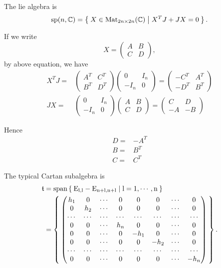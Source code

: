 \documentclass[12pt]{amsart}
\def\Mat{\rm{Mat}}
\def\bC{{\mathbb{C}}}
\def\sspan{\rm{span}}
\def\asp{\mathrm{sp}}
\def\ft{\mathfrak{t}}
\def\Mat{\mathrm{Mat}}
\begin{document}
The lie algebra is 
\[
\asp(n,\bC) = \Set{X\in \Mat_{2n\times 2n}(\bC)| X^TJ + JX = 0}.
\]

If we write 
\[
X = \begin{pmatrix}
  A & B \\
  C & D 
\end{pmatrix},
\]
by above equation, we have
\begin{align*}
X^TJ = & 
\begin{pmatrix}
  A^T & C^T \\
  B^T & D^T
\end{pmatrix}
\begin{pmatrix}
  0 & I_n \\
  -I_n & 0
\end{pmatrix}
= \begin{pmatrix}
-C^T & A^T \\
 -D^T & B^T
\end{pmatrix}\\
JX = & 
\begin{pmatrix}
  0 & I_n \\
  -I_n & 0
\end{pmatrix}
\begin{pmatrix}
  A & B \\
  C & D
\end{pmatrix}
= \begin{pmatrix}
 C & D \\
 -A & -B
\end{pmatrix}
\end{align*}

Hence 
\begin{align*}
D =& -A^T\\
B =& B^T \\
C =&  C^T  
\end{align*}

The typical Cartan subalgebra is 
\[
\begin{split}
\ft &=\sspan\Set{E_{l,l}-E_{n+l,n+l}|l=1,\cdots, n} \\
&= 
\Set{\begin{pmatrix}
    h_1   &   0   & \cdots&  0   & 0    &   0  &\cdots& 0 \\
    0     &   h_2 & \cdots&  0   & 0    &   0  &\cdots& 0  \\
    \cdots& \cdots& \cdots&\cdots&\cdots&\cdots&\cdots& \cdots \\
    0     &   0   & \cdots&  h_n & 0    &   0  &\cdots& 0 \\
    0     &   0   & \cdots&  0   & -h_1 &   0  &\cdots& 0 \\
    0     &   0   & \cdots&  0   &   0  &-h_2  &\cdots& 0 \\
    \cdots& \cdots& \cdots&\cdots&\cdots&\cdots&\cdots& \cdots \\
    0     &   0   &\cdots &  0   &    0 &   0  &\cdots& -h_n     
  \end{pmatrix}}.
\end{split}
\]
\end{document}
